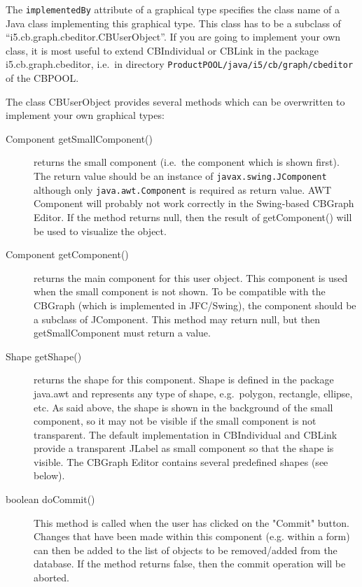 The {\tt implementedBy} attribute of a graphical type specifies the class
name of a Java class implementing this graphical type. This class has to be
a subclass of ``i5.cb.graph.cbeditor.CBUserObject''. If you are going to
implement your own class, it is most useful to extend CBIndividual or CBLink in
the package i5.cb.graph.cbeditor, i.e.\ in
directory {\tt ProductPOOL/java/i5/cb/graph/cbeditor} of the CBPOOL. 

The class CBUserObject provides several methods which can be overwritten
to implement your own graphical types:

\begin{description}
\item[Component getSmallComponent()\\]
   returns the small component (i.e.\ the component which is shown first).
   The return value should be an instance of {\tt javax.swing.JComponent} although only
   {\tt java.awt.\-Component} is required as return value. 
   AWT Component will probably not work correctly in the Swing-based
   CBGraph Editor. If the method returns null, then the result of getComponent() will be used to
   visualize the object.

\item[Component getComponent()\\]
returns the main component for this user object. This component
is used when the small component is not shown. To be compatible
with the CBGraph (which is implemented in JFC/Swing), the component
should be a subclass of JComponent. This method may return null, but then getSmallComponent
must return a value.

\item[Shape getShape()\\]
returns the shape for this component. Shape is defined in the package java.awt
and represents any type of shape, e.g.\ polygon, rectangle, ellipse, etc.
As said above, the shape is shown in the background of the small component,
so it may not be visible if the small component is not transparent. The
default implementation in CBIndividual and CBLink provide a transparent
JLabel as small component so that the shape is visible.
The CBGraph Editor contains several predefined shapes (see below).

\item[boolean doCommit()\\]
This method is called when the user has clicked on the "Commit" button.
Changes that have been made within this component (e.g. within a form) can
then be added to the list of objects to be removed/added from the database.
If the method returns false, then the commit operation will be aborted.
\end{description}


